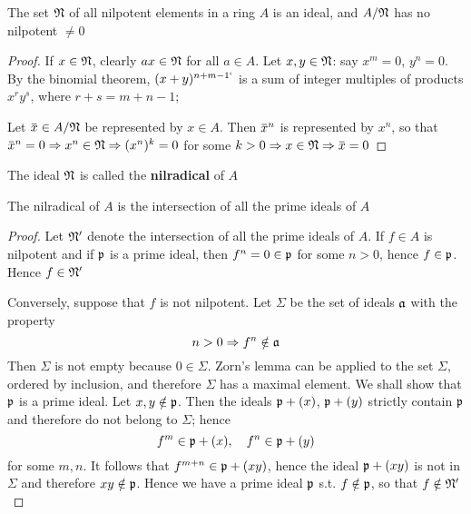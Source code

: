 \documentclass[11pt]{article}
\begin{document}
\begin{proposition}[]
\label{1.7}
The set \(\mathfrak{N}\) of all nilpotent elements in a ring \(A\) is an ideal, and \(A/\mathfrak{N}\) has no
nilpotent \(\neq 0\)
\end{proposition}

\begin{proof}
If \(x\in\mathfrak{N}\), clearly \(ax\in\mathfrak{N}\) for all \(a\in A\). Let \(x,y\in\mathfrak{N}\): say \(x^m=0\), \(y^n=0\). By the
binomial theorem, \((x+y)^{n+m-1`}\) is a sum of integer multiples of products \(x^ry^s\),
where \(r+s=m+n-1\);

Let \(\barx\in A/\fN\) be represented by \(x\in A\). Then \(\barx^n\) is represented by \(x^n\), so
that \(\barx^n=0\Rightarrow x^n\in\fN\Rightarrow(x^n)^k=0\) for some \(k>0\Rightarrow x\in\fN\Rightarrow\barx=0\)
\end{proof}

The ideal \(\mathfrak{N}\) is called the \textbf{nilradical} of \(A\)

\begin{proposition}[]
\label{1.8}
The nilradical of \(A\) is the intersection of all the prime ideals of \(A\)
\end{proposition}

\begin{proof}
Let \(\mathfrak{N}'\) denote the intersection of all the prime ideals of \(A\). If \(f\in A\) is nilpotent
and if \(\mathfrak{p}\) is a prime ideal, then \(f^n=0\in\mathfrak{p}\) for some \(n>0\), hence \(f\in\mathfrak{p}\). Hence \(f\in\mathfrak{N}'\)

Conversely, suppose that \(f\) is not nilpotent. Let \(\Sigma\) be the set of ideals \(\mathfrak{a}\) with the
property
\begin{equation*}
n>0\Rightarrow f^n\notin\mathfrak{a}
\end{equation*}
Then \(\Sigma\) is not empty because \(0\in\Sigma\). Zorn's lemma can be applied to the set \(\Sigma\), ordered by
inclusion, and therefore \(\Sigma\) has a maximal element. We shall show that \(\mathfrak{p}\) is a prime ideal.
Let \(x,y\notin\mathfrak{p}\). Then the ideals \(\mathfrak{p}+(x)\), \(\mathfrak{p}+(y)\) strictly contain \(\mathfrak{p}\) and therefore do not
belong to \(\Sigma\); hence
\begin{equation*}
f^m\in\mathfrak{p}+(x),\quad f^n\in\mathfrak{p}+(y)
\end{equation*}
for some \(m,n\). It follows that \(f^{m+n}\in\mathfrak{p}+(xy)\), hence the ideal \(\mathfrak{p}+(xy)\) is not in
\(\Sigma\) and therefore \(xy\notin\mathfrak{p}\). Hence we have a prime ideal \(\mathfrak{p}\) s.t. \(f\notin\mathfrak{p}\), so that \(f\notin\mathfrak{N}'\)
\end{proof}
\end{document}
